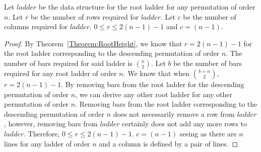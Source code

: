 \begin{corollary}
    Let $ladder$ be the data structure for the root ladder for any permutation of order $n$. Let $r$ be the number of rows required 
    for $ladder$. Let $c$ be the number of columns required for $ladder$. $0 \leq r \leq 2(n-1)-1$ and $c=(n-1)$.
    \label{Corollary:RootHeight}
\end{corollary}
\begin{proof}
    By Theorem~\ref{Theorem:RootHeight}, we know that $r=2(n-1)-1$ for the root ladder corresponding 
    to the descending permutation of order $n$. The number of bars required for said ladder is $n \choose 2$. Let $b$ 
    be the number of bars required for any root ladder of order $n$. We know that when $b=n\choose2$, $r=2(n-1)-1$. By removing 
    bars from the root ladder for the descending permutation of order $n$, we can derive any other root ladder for any other permutation 
    of order $n$. Removing bars from the root ladder corresponding to the descending permutation of order $n$ 
    does not necessarily remove a row from $ladder$, however, removing bars from $ladder$ certainly does not add any more rows 
    to $ladder$. Therefore, $0 \leq r \leq 2(n-1)-1$. $c=(n-1)$ seeing as there are $n$ lines for any ladder of order $n$ and 
    a column is defined by a pair of lines.
\end{proof}



